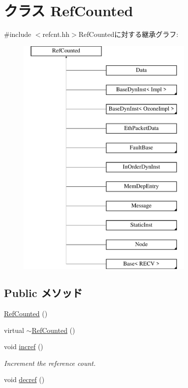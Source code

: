 \hypertarget{classRefCounted}{
\section{クラス RefCounted}
\label{classRefCounted}
}


{\ttfamily \#include $<$refcnt.hh$>$}RefCountedに対する継承グラフ:\begin{figure}[H]
\begin{center}
\leavevmode
\includegraphics[height=12cm]{classRefCounted}
\end{center}
\end{figure}
\subsection*{Public メソッド}
\begin{DoxyCompactItemize}
\item 
\hyperlink{classRefCounted_aebb1990f519367c00c1861b5b3b3e0a5}{RefCounted} ()
\item 
virtual \hyperlink{classRefCounted_ae6cca02ff208ebb8704f20b56e6de02b}{$\sim$RefCounted} ()
\item 
void \hyperlink{classRefCounted_ad16d34c97e8d6a988fd2b5ea36bccbf4}{incref} ()
\begin{DoxyCompactList}\small\item\em Increment the reference count. \item\end{DoxyCompactList}\item 
void \hyperlink{classRefCounted_a0ff5c4fba5e67643030a3e2f5b70a737}{decref} ()
\end{DoxyCompactItemize}
